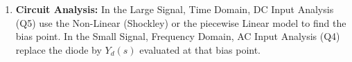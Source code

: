 \begin{enumerate}
\begin{itemize}
\begin{align*}
          C_d &= T_F\, g_d \hspace{1cm} [T_F = \text{forward transit time}]
        \end{align*}
        giving the Q4 admittance \(Y_d(s) = g_d + s(C_j + C_d)\). A reverse
        biased diode has \(g_d \approx 0\) and \(C_d \approx 0\), leaving
        \(Y_d = sC_j\), which is the varactor.
    \end{itemize}
  \item \textbf{Circuit Analysis:}
    In the Large Signal, Time Domain, DC Input Analysis (Q5) use the
    Non-Linear (Shockley) or the piecewise Linear model to find the bias
    point. In the Small Signal, Frequency Domain, AC Input Analysis (Q4)
    replace the diode by \(Y_d(s)\) evaluated at that bias point.
\end{enumerate}

